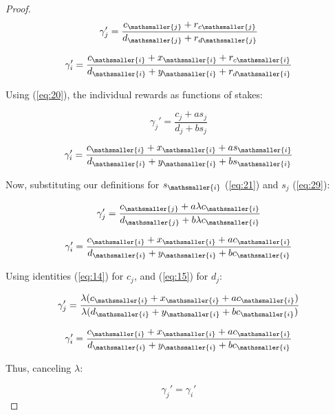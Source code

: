 \documentclass[reqno]{article}
\begin{document}
\begin{proof}
\begin{equation} 
    \gamma_{j}'=\frac{c_\mathsmaller{j}+r_{c\mathsmaller{j}}}{d_\mathsmaller{j}+r_{d\mathsmaller{j}}}
\end{equation}

\begin{equation} 
    \gamma_{i}'=\frac{c_\mathsmaller{i}+x_\mathsmaller{i}+r_{c\mathsmaller{i}}}{d_\mathsmaller{i}+y_\mathsmaller{i}+r_{d\mathsmaller{i}}}
\end{equation}

\bigskip
Using (\ref{eq:20}), the individual rewards as functions of stakes:

\begin{equation} 
    \gamma_{j}'=\frac{c_j+as_j}{d_j+bs_j}
\end{equation}

\begin{equation} 
    \gamma_{i}'=\frac{c_\mathsmaller{i}+x_\mathsmaller{i}+as_\mathsmaller{i}}{d_\mathsmaller{i}+y_\mathsmaller{i}+bs_\mathsmaller{i}}
\end{equation}

\bigskip
Now, substituting our definitions for $s_\mathsmaller{i}$ (\ref{eq:21}) and $s_j$ (\ref{eq:29}):

\begin{equation} 
    \gamma_{j}'=\frac{c_\mathsmaller{j}+a\lambda c_\mathsmaller{i}}{d_\mathsmaller{j}+b\lambda c_\mathsmaller{i}}
\end{equation}

\begin{equation} 
    \gamma_{i}'=\frac{c_\mathsmaller{i}+x_\mathsmaller{i}+ac_\mathsmaller{i}}{d_\mathsmaller{i}+y_\mathsmaller{i}+bc_\mathsmaller{i}}
\end{equation}

\bigskip
Using identities (\ref{eq:14}) for $c_j$, and (\ref{eq:15}) for $d_j$:

\begin{equation} 
    \gamma_{j}'=\frac{\lambda(c_\mathsmaller{i} + x_\mathsmaller{i}+ac_\mathsmaller{i})}{\lambda(d_\mathsmaller{i}+y_\mathsmaller{i}+bc_\mathsmaller{i})}
\end{equation}

\begin{equation} 
    \gamma_{i}'=\frac{c_\mathsmaller{i}+x_\mathsmaller{i}+ac_\mathsmaller{i}}{d_\mathsmaller{i}+y_\mathsmaller{i}+bc_\mathsmaller{i}}
\end{equation}

\bigskip
Thus, canceling $\lambda$:

\begin{equation} 
    \gamma_{j}'=\gamma_{i}'
\end{equation}

\end{proof}
\end{document}
